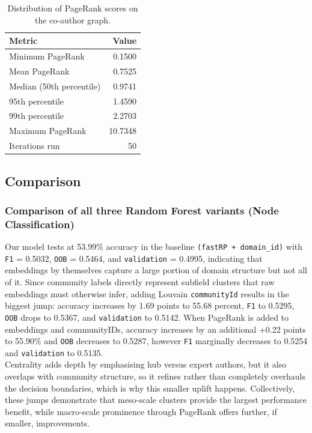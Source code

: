 \documentclass[conference]{IEEEtran}
\begin{document}
\begin{table}[htbp]  %
  \centering
  \begin{tabular}{lr}
    \toprule
    \textbf{Metric}                     & \textbf{Value}   \\
    \midrule
    Minimum PageRank                    & 0.1500           \\
    Mean PageRank                       & 0.7525           \\
    Median (50th percentile)            & 0.9741           \\
    95th percentile                     & 1.4590           \\
    99th percentile                     & 2.2703           \\
    Maximum PageRank                    & 10.7348          \\
    Iterations run                      & 50               \\
    \bottomrule
  \end{tabular}
  \vspace{0.3cm}
  \caption{Distribution of PageRank scores on the co-author graph.}
  \label{tab:pagerank}
\end{table}

\subsection{Comparison}
\subsubsection{\textbf{Comparison of all three Random Forest variants (Node Classification)}}

Our model tests at 53.99\% accuracy in the baseline \texttt{(fastRP + domain\_id)} with \texttt{F1} = 0.5032, \texttt{OOB} = 0.5464, and \texttt{validation} = 0.4995, indicating that embeddings by themselves capture a large portion of domain structure but not all of it.  Since community labels directly represent subfield clusters that raw embeddings must otherwise infer, adding Louvain \texttt{communityId} results in the biggest jump: accuracy increases by 1.69 points to 55.68 percent, \texttt{F1} to 0.5295, \texttt{OOB} drops to 0.5367, and \texttt{validation} to 0.5142.  When PageRank is added to embeddings and communityIDs, accuracy increases by an additional +0.22 points to 55.90\% and \texttt{OOB} decreases to 0.5287, however \texttt{F1} marginally decreases to 0.5254 and \texttt{validation} to 0.5135. \\
\noindent Centrality adds depth by emphasising hub versus expert authors, but it also overlaps with community structure, so it refines rather than completely overhauls the decision boundaries, which is why this smaller uplift happens.  Collectively, these jumps demonstrate that meso-scale clusters provide the largest performance benefit, while macro-scale prominence through PageRank offers further, if smaller, improvements.
\\
\end{document}
